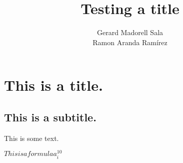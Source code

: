 \documentclass{article}
\begin{document}
 



\title{ Testing a title }

    
    \renewcommand{\today}{ November 2, 2014 }
    

    \author{
            Gerard Madorell Sala \\
            Ramon Aranda Ramírez \\
            }
    

    \maketitle

\newpage




\tableofcontents
\newpage



\section{This is a title.}

\subsection{This is a subtitle.}

This is some text.

$This is a formula a_i^{10}$


\end{document}
